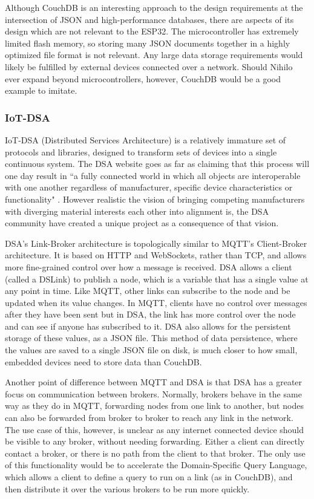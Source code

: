 \documentclass{article}
\begin{document}
Although CouchDB is an interesting approach to the design requirements at the intersection of JSON and high-performance databases, there are aspects of its design which are not relevant to the ESP32. The microcontroller has extremely limited flash memory, so storing many JSON documents together in a highly optimized file format is not relevant. Any large data storage requirements would likely be fulfilled by external devices connected over a network. Should Nihilo ever expand beyond microcontrollers, however, CouchDB would be a good example to imitate.

\subsubsection{IoT-DSA}

IoT-DSA (Distributed Services Architecture) is a relatively immature set of protocols and libraries,  designed to transform sets of devices into a single continuous system. The DSA website goes as far as claiming that this process will one day result in ``a fully connected world in which all objects are interoperable with one another regardless of manufacturer, specific device characteristics or functionality" \cite{dsa}. However realistic the vision of bringing competing manufacturers with diverging material interests each other into alignment is, the DSA community have created a unique project as a consequence of that vision.

DSA's Link-Broker architecture is topologically similar to MQTT's Client-Broker architecture. It is based on HTTP and WebSockets, rather than TCP, and allows more fine-grained control over how a message is received. DSA allows a client (called a DSLink) to publish a node, which is a variable that has a single value at any point in time. Like MQTT, other links can subscribe to the node and be updated when its value changes. In MQTT, clients have no control over messages after they have been sent but in DSA, the link has more control over the node and can see if anyone has subscribed to it. DSA also allows for the persistent storage of these values, as a JSON file. This method of data persistence, where the values are saved to a single JSON file on disk, is much closer to how small, embedded devices need to store data than CouchDB.

Another point of difference between MQTT and DSA is that DSA has a greater focus on communication between brokers. Normally, brokers behave in the same way as they do in MQTT, forwarding nodes from one link to another, but nodes can also be forwarded from broker to broker to reach any link in the network. The use case of this, however, is unclear as any internet connected device should be visible to any broker, without needing forwarding. Either a client can directly contact a broker, or there is no path from the client to that broker. The only use of this functionality would be to accelerate the Domain-Specific Query Language, which allows a client to define a query to run on a link (as in CouchDB), and then distribute it over the various brokers to be run more quickly.
\end{document}
